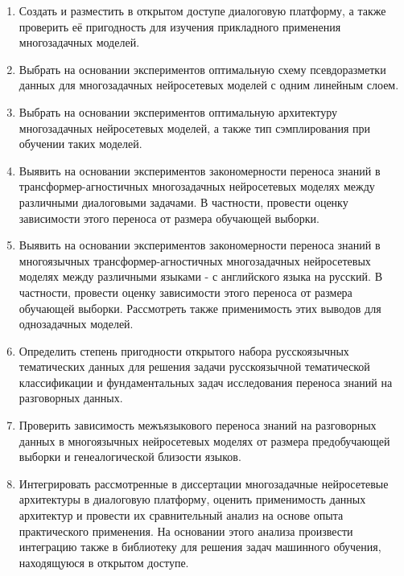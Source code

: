\begin{enumerate}
  \item {Создать и разместить в открытом доступе диалоговую платформу, а также проверить её пригодность для изучения прикладного применения многозадачных моделей.}
  \item {Выбрать на основании экспериментов оптимальную схему псевдоразметки данных для многозадачных нейросетевых моделей с одним линейным слоем.}
  \item {Выбрать на основании экспериментов оптимальную архитектуру многозадачных нейросетевых моделей, а также тип сэмплирования при обучении таких моделей.}
  \item {Выявить на основании экспериментов закономерности переноса знаний в трансформер-агностичных многозадачных нейросетевых моделях между различными диалоговыми задачами. В частности, провести оценку зависимости этого переноса от размера обучающей выборки.}
  \item {Выявить на основании экспериментов закономерности переноса знаний в многоязычных трансформер-агностичных многозадачных нейросетевых моделях между различными языками - с английского языка на русский. В частности, провести оценку зависимости этого переноса от размера обучающей выборки. Рассмотреть также применимость этих выводов для однозадачных моделей.}
  \item {Определить степень пригодности  открытого набора русскоязычных тематических данных для решения задачи русскоязычной тематической классификации и фундаментальных задач исследования переноса знаний на разговорных данных.}
  \item {Проверить зависимость межъязыкового переноса знаний на разговорных данных в многоязычных нейросетевых моделях от размера предобучающей выборки и генеалогической близости языков.}
  \item {Интегрировать рассмотренные в диссертации многозадачные нейросетевые архитектуры в диалоговую платформу, оценить применимость данных архитектур и провести их сравнительный анализ на основе опыта практического применения. На основании этого анализа произвести интеграцию также в библиотеку для решения задач машинного обучения, находящуюся в открытом доступе.}
  \newline
  \newline
\end{enumerate}


